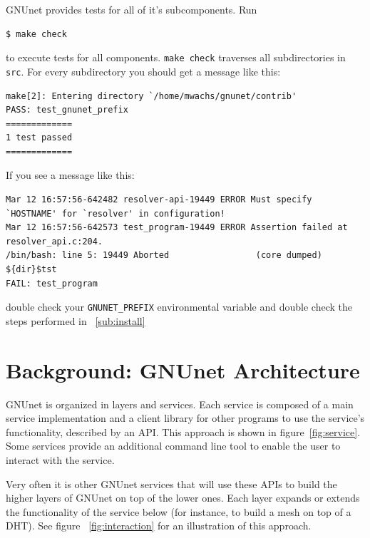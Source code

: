 \documentclass[10pt]{article}
\begin{document}
GNUnet provides tests for all of it's subcomponents. Run
\begin{lstlisting}
$ make check
\end{lstlisting}
to execute tests for all components. {\tt make check} traverses all subdirectories in {\tt src}. 
For every subdirectory you should get a message like this:

\begin{lstlisting}
make[2]: Entering directory `/home/mwachs/gnunet/contrib'
PASS: test_gnunet_prefix
=============
1 test passed
=============
\end{lstlisting}

If you see a message like this:

\begin{lstlisting}
Mar 12 16:57:56-642482 resolver-api-19449 ERROR Must specify `HOSTNAME' for `resolver' in configuration!
Mar 12 16:57:56-642573 test_program-19449 ERROR Assertion failed at resolver_api.c:204.
/bin/bash: line 5: 19449 Aborted                 (core dumped) ${dir}$tst
FAIL: test_program
\end{lstlisting}
double check your {\tt GNUNET\_PREFIX} environmental variable and double check the steps performed in ~\ref{sub:install}

\section{Background: GNUnet Architecture}
GNUnet is organized in layers and services. Each service is composed of a
main service implementation and a client library for other programs to use 
the service's functionality, described by an API. This approach is shown in 
figure~\ref{fig:service}. Some services provide an additional command line 
tool to enable the user to interact with the service.

Very often it is other GNUnet services that will use these APIs to build the
higher layers of GNUnet on top of the lower ones. Each layer expands or extends
the functionality of the service below (for instance, to build a mesh on top of
a DHT). See figure ~\ref{fig:interaction} for an illustration of this approach.
\end{document}
